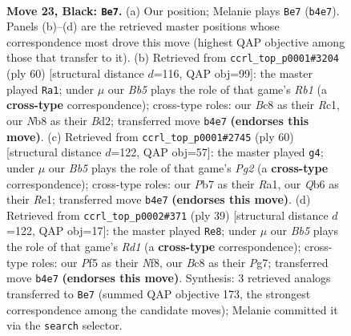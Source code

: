 \documentclass[11pt]{article}
\begin{document}
\clearpage

\begin{figure}[p]\centering
\begin{subfigure}{0.46\textwidth}\centering
\resizebox{\linewidth}{!}{%
\newchessgame
\chessboard[
  setfen={rnb1n1k1/1p4pp/1q5r/p4p1P/PbPN3R/6P1/6B1/RNBQ2K1 b - - 7 23},
  showmover=false,
  pgfstyle=straightmove, color=movearrow, markmove={b4-e7}
]}
\caption{}
\end{subfigure}\hfill
\begin{subfigure}{0.46\textwidth}\centering
\resizebox{\linewidth}{!}{%
\newchessgame
\chessboard[
  setfen={2r5/3rbpk1/2q1p1p1/1p1n3p/3P3P/1BP2QP1/3B1PK1/1RR5 w - - 1 31},
  showmover=false,
  pgfstyle=straightmove, color=movearrow, markmove={b1-a1}
]}
\caption{}
\end{subfigure}
\\[4pt]
\begin{subfigure}{0.46\textwidth}\centering
\resizebox{\linewidth}{!}{%
\newchessgame
\chessboard[
  setfen={1r5k/1q4p1/4r2p/1bP1pp2/1P1pn3/3N1B1P/2Q2PP1/R3R1K1 w - - 6 31},
  showmover=false,
  pgfstyle=straightmove, color=movearrow, markmove={g2-g4}
]}
\caption{}
\end{subfigure}\hfill
\begin{subfigure}{0.46\textwidth}\centering
\resizebox{\linewidth}{!}{%
\newchessgame
\chessboard[
  setfen={r2r1nk1/1pq2pp1/p1p1b3/P4ppP/3P4/2P3P1/1PQN1PB1/R3R1K1 b - - 1 20},
  showmover=false,
  pgfstyle=straightmove, color=movearrow, markmove={d8-e8}
]}
\caption{}
\end{subfigure}
\caption{\textbf{Move 23, Black: \texttt{Be7}.} (a) Our position; Melanie plays \texttt{Be7} (\texttt{b4e7}). Panels (b)--(d) are the retrieved master positions whose correspondence most drove this move (highest QAP objective among those that transfer to it). (b) Retrieved from \texttt{ccrl\_top\_p0001\#3204} (ply 60) [structural distance $d$=116, QAP obj=99]: the master played \texttt{Ra1}; under $\mu$ our \emph{Bb5} plays the role of that game's \emph{Rb1} (a \textbf{cross-type} correspondence); cross-type roles: our \emph{B}c8 as their \emph{R}c1, our \emph{N}b8 as their \emph{B}d2; transferred move \texttt{b4e7} \textbf{(endorses this move)}. (c) Retrieved from \texttt{ccrl\_top\_p0001\#2745} (ply 60) [structural distance $d$=122, QAP obj=57]: the master played \texttt{g4}; under $\mu$ our \emph{Bb5} plays the role of that game's \emph{Pg2} (a \textbf{cross-type} correspondence); cross-type roles: our \emph{P}b7 as their \emph{R}a1, our \emph{Q}b6 as their \emph{R}e1; transferred move \texttt{b4e7} \textbf{(endorses this move)}. (d) Retrieved from \texttt{ccrl\_top\_p0002\#371} (ply 39) [structural distance $d$=122, QAP obj=17]: the master played \texttt{Re8}; under $\mu$ our \emph{Bb5} plays the role of that game's \emph{Rd1} (a \textbf{cross-type} correspondence); cross-type roles: our \emph{P}f5 as their \emph{N}f8, our \emph{B}c8 as their \emph{P}g7; transferred move \texttt{b4e7} \textbf{(endorses this move)}. Synthesis: 3 retrieved analogs transferred to \texttt{Be7} (summed QAP objective 173, the strongest correspondence among the candidate moves); Melanie committed it via the \texttt{search} selector.}
\label{fig:thought-m45}
\end{figure}
\end{document}
